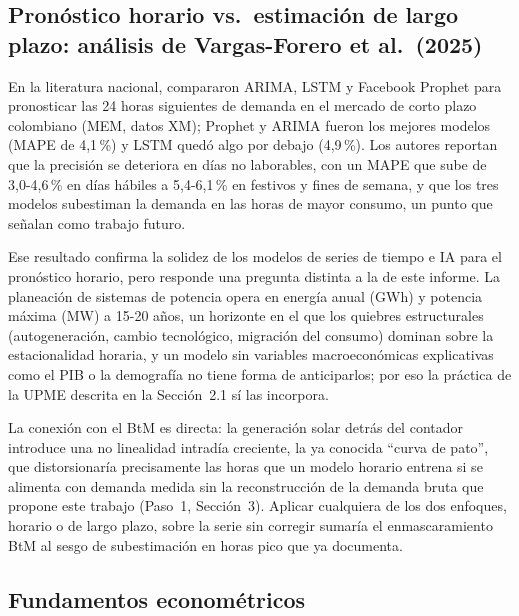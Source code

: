 \documentclass[11pt,letterpaper]{article}
\begin{document}
\subsection{Pronóstico horario vs.\ estimación de largo plazo: análisis de
Vargas-Forero et al.\ (2025)}

En la literatura nacional, \cite{vargas2025} compararon ARIMA, LSTM y
Facebook Prophet para pronosticar las 24 horas siguientes de demanda en el
mercado de corto plazo colombiano (MEM, datos XM); Prophet y ARIMA fueron
los mejores modelos (MAPE de 4,1\,\%) y LSTM quedó algo por debajo (4,9\,\%).
Los autores reportan que la precisión se deteriora en días no laborables,
con un MAPE que sube de 3,0-4,6\,\% en días hábiles a 5,4-6,1\,\% en
festivos y fines de semana, y que los tres modelos subestiman la demanda en
las horas de mayor consumo, un punto que señalan como trabajo futuro.

Ese resultado confirma la solidez de los modelos de series de tiempo e IA
para el pronóstico horario, pero responde una pregunta distinta a la de este
informe. La planeación de sistemas de potencia opera en energía anual (GWh)
y potencia máxima (MW) a 15-20 años, un horizonte en el que los quiebres
estructurales (autogeneración, cambio tecnológico, migración del consumo)
dominan sobre la estacionalidad horaria, y un modelo sin variables
macroeconómicas explicativas como el PIB o la demografía no tiene forma de
anticiparlos; por eso la práctica de la UPME descrita en la Sección~2.1 sí
las incorpora.

La conexión con el BtM es directa: la generación solar detrás del contador
introduce una no linealidad intradía creciente, la ya conocida ``curva de
pato'', que distorsionaría precisamente las horas que un modelo horario
entrena si se alimenta con demanda medida sin la reconstrucción de la
demanda bruta que propone este trabajo (Paso~1, Sección~3). Aplicar
cualquiera de los dos enfoques, horario o de largo plazo, sobre la serie sin
corregir sumaría el enmascaramiento BtM al sesgo de subestimación en horas
pico que \cite{vargas2025} ya documenta.

\subsection{Fundamentos econométricos}
\end{document}
